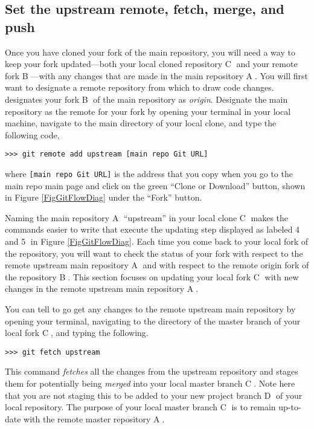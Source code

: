   \subsection{Set the upstream remote, fetch, merge, and push}\label{SecGitStructUpstream}

    Once you have cloned your fork of the main repository, you will need a way to keep your fork updated---both your local cloned repository \textcircled{C} and your remote fork \textcircled{B}---with any changes that are made in the main repository \textcircled{A}. You will first want to designate a remote repository from which to draw code changes. \git designates your fork \textcircled{B} of the main repository as \textit{origin}. Designate the main repository as the remote for your fork by opening your terminal in your local machine, navigate to the main directory of your local clone, and type the following code,
    \begin{lstlisting}[frame=single]
      >>> git remote add upstream [main repo Git URL]
    \end{lstlisting}
    where \texttt{[main repo Git URL]} is the address that you copy when you go to the main repo main page and click on the green ``Clone or Download'' button, shown in Figure \ref{FigGitFlowDiag} under the ``Fork'' button.

    Naming the main repository \textcircled{A} ``upstream'' in your local clone \textcircled{C} makes the commands easier to write that execute the updating step displayed as labeled \textcircled{4} and \textcircled{5} in Figure \ref{FigGitFlowDiag}. Each time you come back to your local fork of the repository, you will want to check the status of your fork with respect to the remote upstream main repository \textcircled{A} and with respect to the remote origin fork of the repository \textcircled{B}. This section focuses on updating your local fork \textcircled{C} with new changes in the remote upstream main repository \textcircled{A}.

    You can tell \git to go get any changes to the remote upstream main repository by opening your terminal, navigating to the directory of the master branch of your local fork \textcircled{C}, and typing the following.
    \begin{lstlisting}[frame=single]
      >>> git fetch upstream
    \end{lstlisting}
    This command \textit{fetches} all the changes from the upstream repository and stages them for potentially being \textit{merged} into your local master branch \textcircled{C}. Note here that you are not staging this to be added to your new project branch \textcircled{D} of your local repository. The purpose of your local master branch \textcircled{C} is to remain up-to-date with the remote master repository \textcircled{A}.

